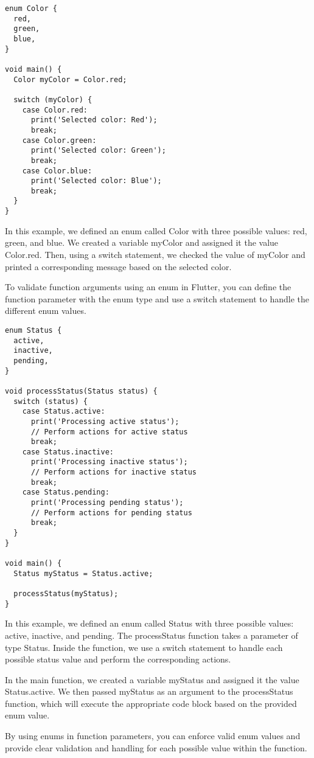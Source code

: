 \begin{lstlisting}
enum Color {
  red,
  green,
  blue,
}

void main() {
  Color myColor = Color.red;

  switch (myColor) {
    case Color.red:
      print('Selected color: Red');
      break;
    case Color.green:
      print('Selected color: Green');
      break;
    case Color.blue:
      print('Selected color: Blue');
      break;
  }
}
\end{lstlisting}

In this example, we defined an enum called Color with three possible values: red, green, and blue. We created a 
variable myColor and assigned it the value Color.red. Then, using a switch statement, we checked the value of 
myColor and printed a corresponding message based on the selected color.

To validate function arguments using an enum in Flutter, you can define the function parameter with the enum type and 
use a switch statement to handle the different enum values.

\begin{lstlisting}
enum Status {
  active,
  inactive,
  pending,
}

void processStatus(Status status) {
  switch (status) {
    case Status.active:
      print('Processing active status');
      // Perform actions for active status
      break;
    case Status.inactive:
      print('Processing inactive status');
      // Perform actions for inactive status
      break;
    case Status.pending:
      print('Processing pending status');
      // Perform actions for pending status
      break;
  }
}

void main() {
  Status myStatus = Status.active;

  processStatus(myStatus);
}
\end{lstlisting}

In this example, we defined an enum called Status with three possible values: active, inactive, and pending. The 
processStatus function takes a parameter of type Status. Inside the function, we use a switch statement to 
handle each possible status value and perform the corresponding actions.

In the main function, we created a variable myStatus and assigned it the value Status.active. We then passed 
myStatus as an argument to the processStatus function, which will execute the appropriate code block based on 
the provided enum value.

By using enums in function parameters, you can enforce valid enum values and provide clear validation and handling 
for each possible value within the function.

